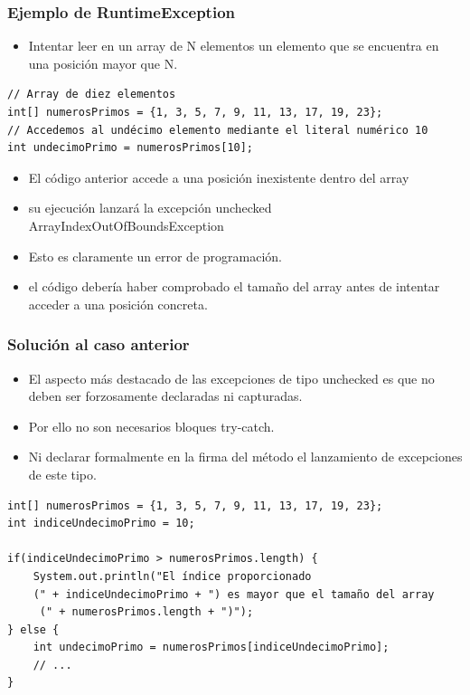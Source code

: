 \documentclass{beamer}
\begin{document}
\begin{frame}[fragile]
\frametitle{Ejemplo de RuntimeException}
\begin{footnotesize}
\begin{itemize}[<+->]
\item Intentar leer en un array de N elementos un elemento que se encuentra en una posición mayor que N.
\end{itemize}
\end{footnotesize}
\pause
\begin{scriptsize}
\begin{verbatim}
// Array de diez elementos 
int[] numerosPrimos = {1, 3, 5, 7, 9, 11, 13, 17, 19, 23};   
// Accedemos al undécimo elemento mediante el literal numérico 10 
int undecimoPrimo = numerosPrimos[10];    
\end{verbatim}
\end{scriptsize}
\pause
\begin{footnotesize}
\begin{itemize}[<+->]
\item El código anterior accede a una posición inexistente dentro del array
\item su ejecución lanzará la excepción unchecked ArrayIndexOutOfBoundsException
\item Esto es claramente un error de programación.
\item el código debería haber comprobado el tamaño del array antes de intentar acceder a una posición concreta.
\end{itemize}
\end{footnotesize}
\end{frame}

\begin{frame}[fragile]
\frametitle{Solución al caso anterior}
\begin{itemize}[<+->]
\item El aspecto más destacado de las excepciones de tipo unchecked es que no deben ser forzosamente declaradas ni capturadas.
\item  Por ello no son necesarios bloques try-catch.
\item Ni declarar formalmente en la firma del método el lanzamiento de excepciones de este tipo. 
\end{itemize}
\pause
\begin{footnotesize}
\begin{verbatim}
int[] numerosPrimos = {1, 3, 5, 7, 9, 11, 13, 17, 19, 23}; 
int indiceUndecimoPrimo = 10; 

if(indiceUndecimoPrimo > numerosPrimos.length) { 
    System.out.println("El índice proporcionado 
    (" + indiceUndecimoPrimo + ") es mayor que el tamaño del array
     (" + numerosPrimos.length + ")"); 
} else { 
    int undecimoPrimo = numerosPrimos[indiceUndecimoPrimo]; 
    // ... 
} 
\end{verbatim}
\end{footnotesize}
\end{frame}
\end{document}
